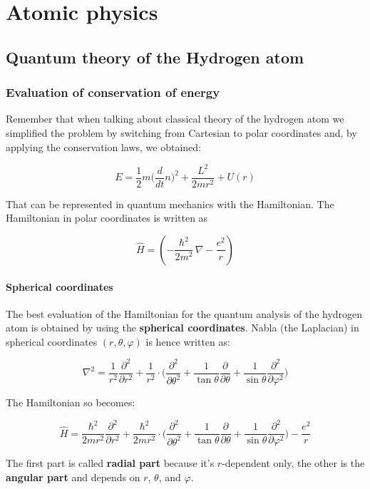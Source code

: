 \graphicspath{{chapters/06/}}
\chapter{Atomic physics}

\section{Quantum theory of the Hydrogen atom}

	\subsection{Evaluation of conservation of energy}
	Remember that when talking about classical theory of the hydrogen atom we simplified the problem by switching from Cartesian to polar coordinates and, by applying the conservation laws, we obtained:

	$$E=\frac{1}{2}m\bigg(\frac{d}{dt}n\bigg)^2+\frac{L^2}{2mr^2}+U(r)$$

	That can be represented in quantum mechanics with the Hamiltonian.
	The Hamiltonian in polar coordinates is written as

	$$\hat{H}=(-\frac{\hbar^2}{2m^2}\, \nabla - \frac{e^2}{r})$$

		\subsubsection{Spherical coordinates}
		The best evaluation of the Hamiltonian for the quantum analysis of the hydrogen atom is obtained by using the \textbf{spherical coordinates}.
		Nabla (the Laplacian) in spherical coordinates $(r,\theta,\varphi)$ is hence written as:

		$$\nabla^2=\frac{1}{r^2}\frac{\partial^2}{\partial r^2}+\frac{1}{r^2}\cdot\bigg(\frac{\partial^2}{\partial \theta^2}+\frac{1}{\tan\theta}\frac{\partial}{\partial\theta}+\frac{1}{\sin\theta}\frac{\partial^2}{\partial\varphi^2}\bigg)$$

		The Hamiltonian so becomes:

		$$\hat{H}=\frac{\hbar^2}{2mr^2}\frac{\partial^2}{\partial r^2}+\frac{\hbar^2}{2mr^2}\cdot\bigg(\frac{\partial^2}{\partial \theta^2}+\frac{1}{\tan\theta}\frac{\partial}{\partial\theta}+\frac{1}{\sin\theta}\frac{\partial^2}{\partial\varphi^2}\bigg)-\frac{e^2}{r}$$

		The first part is called \textbf{radial part} because it's $r$-dependent only, the other is the \textbf{angular part} and depends on $r$, $\theta$, and $\varphi$.

